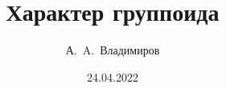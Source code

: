 \documentclass[11pt]{article}
\theoremstyle{plain}
\theoremstyle{definition}
\theoremstyle{remark}
\begin{document}
\author{А.~A.~Владимиров}
\title{Характер группоида}
\date{24.04.2022}
\maketitle



\end{document}
